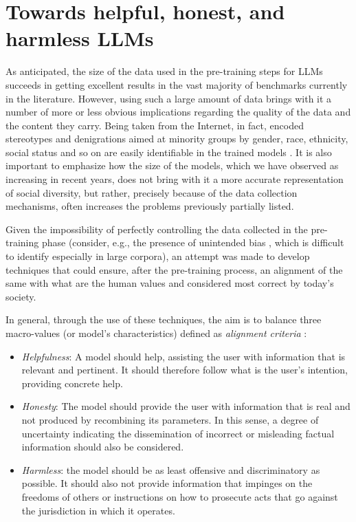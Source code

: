 \section{Towards helpful, honest, and harmless LLMs}

As anticipated, the size of the data used in the pre-training steps for LLMs succeeds in getting excellent results in the vast majority of benchmarks currently in the literature. However, using such a large amount of data brings with it a number of more or less obvious implications regarding the quality of the data and the content they carry. Being taken from the Internet, in fact, encoded stereotypes and denigrations aimed at minority groups by gender, race, ethnicity, social status and so on are easily identifiable in the trained models \citep{10.1145/3442188.3445922a}. It is also important to emphasize how the size of the models, which we have observed as increasing in recent years, does not bring with it a more accurate representation of social diversity, but rather, precisely because of the data collection mechanisms, often increases the problems previously partially listed.

Given the impossibility of perfectly controlling the data collected in the pre-training phase (consider, e.g., the presence of unintended bias \citep{10.1145/3278721.3278729}, which is difficult to identify especially in large corpora), an attempt was made to develop techniques that could ensure, after the pre-training process, an alignment of the same with what are the human values and considered most correct by today's society.

In general, through the use of these techniques, the aim is to balance three macro-values (or model's characteristics) defined as \textit{alignment criteria} \citep{NEURIPS2022_b1efde53, askell2021general}: 
\begin{itemize}
    \item \textit{Helpfulness}: A model should help, assisting the user with information that is relevant and pertinent. It should therefore follow what is the user's intention, providing concrete help.
    \item \textit{Honesty}: The model should provide the user with information that is real and not produced by recombining its parameters. In this sense, a degree of uncertainty indicating the dissemination of incorrect or misleading factual information should also be considered.
    \item \textit{Harmless}: the model should be as least offensive and discriminatory as possible. It should also not provide information that impinges on the freedoms of others or instructions on how to prosecute acts that go against the jurisdiction in which it operates.
\end{itemize}

